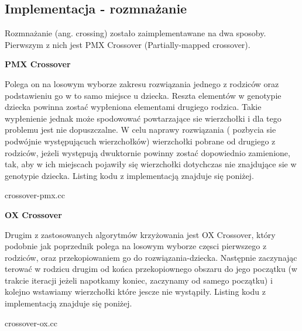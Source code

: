 \documentclass[polish,polish,a4paper]{article}
\begin{document}
\subsection{Implementacja - rozmnażanie}
Rozmnażanie (ang. crossing) zostało zaimplementawane na dwa sposoby. Pierwszym z nich jest PMX Crossover (Partially-mapped crossover).

\par \textbf{PMX Crossover}
\par Polega on na losowym
wyborze zakresu rozwiązania jednego z rodziców oraz podstawieniu go w to samo miejsce u dziecka. Reszta elementów w genotypie dziecka powinna zostać 
wypłeniona elementami drugiego rodzica. Takie wypłenienie jednak może spodowować powtarzające sie wierzchołki i dla tego problemu jest nie dopuszczalne.
W celu naprawy rozwiązania ( pozbycia sie podwójnie występującuch wierzchołków) wierzchołki pobrane od drugiego z rodziców, jeżeli występują dwuktornie
powinny zostać dopowiednio zamienione, tak, aby w ich miejscach pojawiły się wierzchołki dotychczas nie znajdujące sie w genotypie dziecka.
Listing kodu z implementacją znajduje się poniżej.

\pagebreak


{crossover-pmx.cc}

\pagebreak

\par \textbf{OX Crossover}
\par Drugim z zastosowanych algorytmów krzyżowania jest OX Crossover, który podobnie jak poprzednik polega na losowym wyborze częsci pierwszego z rodziców,
oraz przekopiowaniem go do rozwiązania-dziecka. Następnie zaczynając terować w rodzicu drugim od końca przekopiownego obszaru do jego początku
(w trakcie iteracji jeżeli napotkamy koniec, zaczynamy od samego początku) i kolejno wstawiamy wierzchołki które jescze nie wystąpiły.
Listing kodu z implementacją znajduje się poniżej.


{crossover-ox.cc}


\pagebreak
\end{document}
